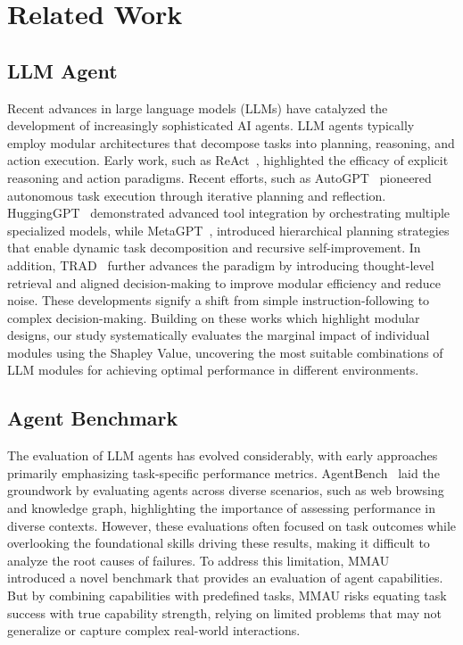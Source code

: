 \section{Related Work}
\subsection{LLM Agent}
Recent advances in large language models (LLMs) have catalyzed the development of increasingly sophisticated AI agents. LLM agents typically employ modular architectures that decompose tasks into planning, reasoning, and action execution. Early work, such as ReAct~\citep{yao2022react}, highlighted the efficacy of explicit reasoning and action paradigms. Recent efforts, such as AutoGPT~\citep{autogpt} pioneered autonomous task execution through iterative planning and reflection. HuggingGPT~\citep{shen2023hugginggpt} demonstrated advanced tool integration by orchestrating multiple specialized models, while MetaGPT~\citep{hong2024metagpt}, introduced hierarchical planning strategies that enable dynamic task decomposition and recursive self-improvement.
In addition, TRAD~\citep{zhou2024tradenhancingllmagents} further advances the paradigm by introducing thought-level retrieval and aligned decision-making to improve modular efficiency and reduce noise.
These developments signify a shift from simple instruction-following to complex decision-making. 
Building on these works which highlight modular designs, our study systematically evaluates the marginal impact of individual modules using the Shapley Value, uncovering the most suitable combinations of LLM modules for achieving optimal performance in different environments.

\subsection{Agent Benchmark}
The evaluation of LLM agents has evolved considerably, with early approaches primarily emphasizing task-specific performance metrics. AgentBench~\citep{liu2023agentbench} laid the groundwork by evaluating agents across diverse scenarios, such as web browsing and knowledge graph, highlighting the importance of assessing performance in diverse contexts. However, these evaluations often focused on task outcomes while overlooking the foundational skills driving these results, making it difficult to analyze the root causes of failures. To address this limitation, MMAU~\citep{yin2024mmauholisticbenchmarkagent} introduced a novel benchmark that provides an evaluation of agent capabilities.  But by combining capabilities with predefined tasks, MMAU risks equating task success with true capability strength, relying on limited problems that may not generalize or capture complex real-world interactions.

